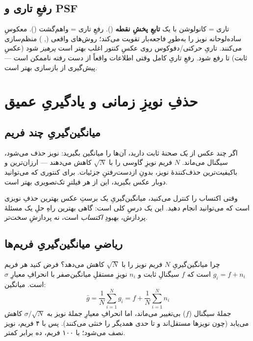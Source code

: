 \documentclass[12pt,a4paper]{article}
\begin{document}
\subsection{رفعِ تاری و PSF}

تاری = کانولوشن با یک \textbf{تابعِ پخشِ نقطه} (). رفعِ تاری = واهم‌گشت ().
معکوسِ ساده‌لوحانه نویز را به‌طورِ فاجعه‌بار تقویت می‌کند؛ روش‌های واقعی (,
) منظم‌سازی می‌کنند. تاریِ حرکتی/دفوکوس روی عکسِ کنتور اغلب بهتر است
\emph{پرهیز} شود (عکسِ ثابت) تا رفع شود. رفعِ تاریِ کامل وقتی اطلاعات واقعاً از دست رفته ناممکن
است — پیش‌گیری از بازسازی بهتر است.

\section{حذفِ نویزِ زمانی و یادگیریِ عمیق}

\subsection{میانگین‌گیریِ چند فریم}

اگر چند عکس از \emph{یک} صحنهٔ ثابت دارید، آن‌ها را میانگین بگیرید: نویز حذف می‌شود، سیگنال
می‌ماند. $N$ فریم نویزِ گاوسی را با $\sqrt{N}$ کاهش می‌دهند — ارزان‌ترین و باکیفیت‌ترین
حذف‌کنندهٔ نویز، بدونِ از‌دست‌رفتنِ جزئیات. برای کنتوری که می‌توانید دوبار عکس بگیرید، این از هر
فیلترِ تک‌تصویری بهتر است.

\begin{yaddasht}
وقتی اکتساب را کنترل می‌کنید، میانگین‌گیریِ یک برستِ عکس بهترین حذفِ نویزی است که می‌توانید انجام
دهید. این یک درسِ کلی است: گاهی بهترین راهِ حلِ یک مسئلهٔ پردازش، بهبودِ \emph{اکتساب} است، نه
پردازشِ سخت‌تر.
\end{yaddasht}

\subsection{ریاضیِ میانگین‌گیریِ فریم‌ها}

چرا میانگین‌گیریِ $N$ فریم نویز را با $\sqrt{N}$ کاهش می‌دهد؟ فرض کنید هر فریم
$g_i = f + n_i$ است که $f$ سیگنالِ ثابت و $n_i$ نویزِ مستقلِ میانگین‌صفر با انحرافِ معیارِ
$\sigma$ است. میانگین:
\[
\bar{g} = \frac{1}{N}\sum_{i=1}^{N} g_i = f + \frac{1}{N}\sum_{i=1}^{N} n_i
\]
جملهٔ سیگنال ($f$) بی‌تغییر می‌ماند، اما انحرافِ معیارِ جملهٔ نویز به $\sigma/\sqrt{N}$ کاهش
می‌یابد (چون نویزها مستقل‌اند و تا حدی همدیگر را خنثی می‌کنند). پس با ۴ فریم، نویز نصف می‌شود؛ با
۱۰۰ فریم، ده برابر کمتر.
\end{document}
